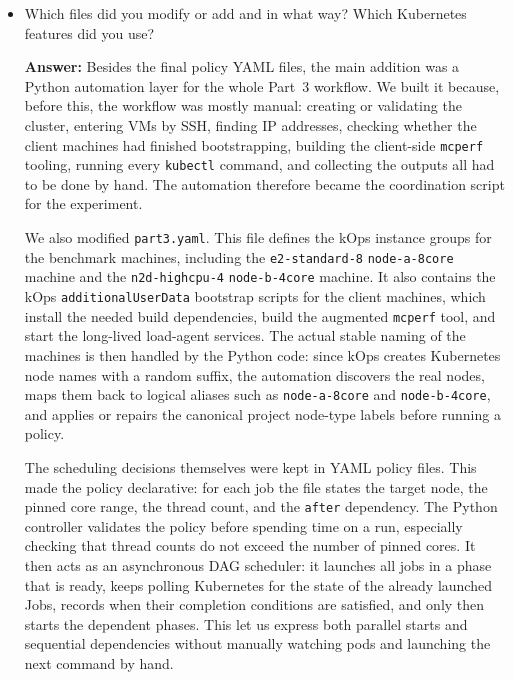 \begin{enumerate}
\begin{enumerate}
\begin{itemize}
        \item Which files did you modify or add and in what way? Which Kubernetes features did you use?
    
        \textbf{Answer:} Besides the final policy YAML files, the main addition
        was a Python automation layer for the whole Part~3 workflow. We built it
        because, before this, the workflow was mostly manual: creating or
        validating the cluster, entering VMs by SSH, finding IP addresses,
        checking whether the client machines had finished bootstrapping,
        building the client-side \texttt{mcperf} tooling, running every
        \texttt{kubectl} command, and collecting the outputs all had to be done
        by hand. The automation therefore became the coordination script for the
        experiment.

        We also modified \texttt{part3.yaml}. This file defines the kOps
        instance groups for the benchmark machines, including the
        \texttt{e2-standard-8} \texttt{node-a-8core} machine and the
        \texttt{n2d-highcpu-4} \texttt{node-b-4core} machine. It also contains
        the kOps \texttt{additional}\allowbreak\texttt{UserData} bootstrap
        scripts for the client machines, which install the needed build
        dependencies, build the augmented \texttt{mcperf} tool, and start the
        long-lived load-agent services. The actual stable naming of the
        machines is then handled by the Python code: since kOps creates
        Kubernetes node names with a random suffix, the automation discovers the
        real nodes, maps them back to logical aliases such as
        \texttt{node-a-8core} and \texttt{node-b-4core}, and applies or repairs
        the canonical project node-type labels before running a policy.

        The scheduling decisions themselves were kept in YAML policy files.
        This made the policy declarative: for each job the file states the
        target node, the pinned core range, the thread count, and the
        \texttt{after} dependency. The Python controller validates the policy
        before spending time on a run, especially checking that thread counts do
        not exceed the number of pinned cores. It then acts as an asynchronous
        DAG scheduler: it launches all jobs in a phase that is ready, keeps
        polling Kubernetes for the state of the already launched Jobs, records
        when their completion conditions are satisfied, and only then starts the
        dependent phases. This let us express both parallel starts and
        sequential dependencies without manually watching pods and launching the
        next command by hand.


\end{itemize}
\end{enumerate}
\end{enumerate}
